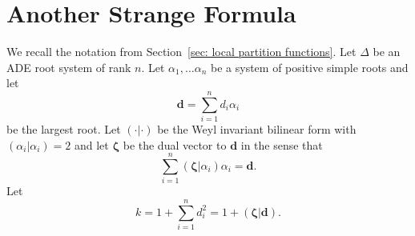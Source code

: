 \documentclass{amsart}
\theoremstyle{definition}
\newcommand{\zetavec}{\bm{\zeta }}
\newcommand{\dvec}{\bm{d }}
\begin{document}
\appendix
\section{Another Strange Formula}\label{sec: another strange
formula}

We recall the notation from Section~\ref{sec: local partition
functions}. Let $\Delta$ be an ADE root system of rank $n$. Let
$\alpha_{1},\dotsc \alpha_{n}$ be a system of positive simple roots
and let
\[
\dvec  = \sum_{i=1}^{n} d_{i} \alpha_{i}
\]
be the largest root. Let $(\cdot |\cdot )$ be the Weyl invariant
bilinear form with $(\alpha_{i}|\alpha_{i})=2$ and let $\zetavec$ be
the dual vector to $\dvec$ in the sense that
\begin{equation}\label{eqn: d = sum (zeta|ai)ai}
\sum_{i=1}^{n} (\zetavec |\alpha_{i}) \alpha_{i} = \dvec .
\end{equation}
Let 
\begin{equation}\label{eqn: k=1+(zeta|d)}
k=1+\sum_{i=1}^{n}d_{i}^{2} =  1+(\zetavec |\dvec ). 
\end{equation}
\end{document}
